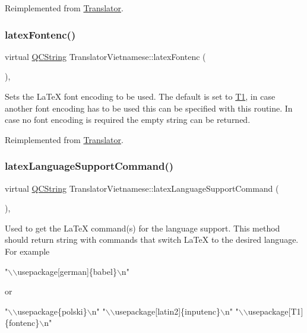 Reimplemented from \mbox{\hyperlink{class_translator_a9e87df46e59ca15713f43205aeb17ea0}{Translator}}.

\mbox{\label{class_translator_vietnamese_aa6626da0407f685b42d9c40bdf83b62e}} 
\subsubsection{\texorpdfstring{latexFontenc()}{latexFontenc()}}
{\footnotesize\ttfamily virtual \mbox{\hyperlink{class_q_c_string}{Q\+C\+String}} Translator\+Vietnamese\+::latex\+Fontenc (\begin{DoxyParamCaption}{ }\end{DoxyParamCaption})\hspace{0.3cm}{\ttfamily [inline]}, {\ttfamily [virtual]}}

Sets the La\+TeX font encoding to be used. The default is set to {\ttfamily \mbox{\hyperlink{class_t1}{T1}}}, in case another font encoding has to be used this can be specified with this routine. In case no font encoding is required the empty string can be returned. 

Reimplemented from \mbox{\hyperlink{class_translator_a573b483369d8d7cf7d85831a9da356be}{Translator}}.

\mbox{\label{class_translator_vietnamese_a40aa5ca6be73b698e3af89f889c1e636}} 
\subsubsection{\texorpdfstring{latexLanguageSupportCommand()}{latexLanguageSupportCommand()}}
{\footnotesize\ttfamily virtual \mbox{\hyperlink{class_q_c_string}{Q\+C\+String}} Translator\+Vietnamese\+::latex\+Language\+Support\+Command (\begin{DoxyParamCaption}{ }\end{DoxyParamCaption})\hspace{0.3cm}{\ttfamily [inline]}, {\ttfamily [virtual]}}

Used to get the La\+TeX command(s) for the language support. This method should return string with commands that switch La\+TeX to the desired language. For example 
\begin{DoxyPre}"\(\backslash\)\(\backslash\)usepackage[german]\{babel\}\(\backslash\)n"
 \end{DoxyPre}
 or 
\begin{DoxyPre}"\(\backslash\)\(\backslash\)usepackage\{polski\}\(\backslash\)n"
 "\(\backslash\)\(\backslash\)usepackage[latin2]\{inputenc\}\(\backslash\)n"
 "\(\backslash\)\(\backslash\)usepackage[T1]\{fontenc\}\(\backslash\)n"
 \end{DoxyPre}


